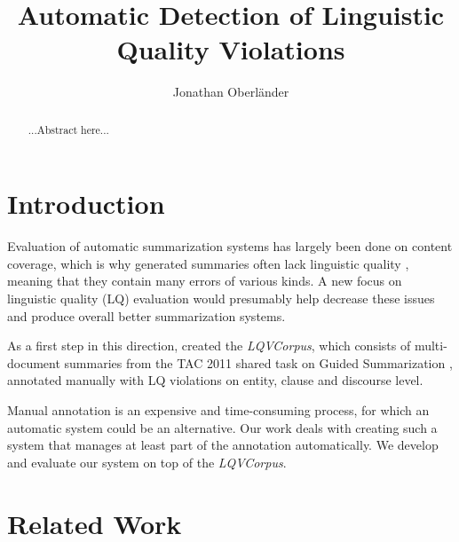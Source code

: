 \documentclass[a4paper,10pt]{scrartcl}
\author{Jonathan Oberländer}
\title{Automatic Detection of Linguistic Quality Violations}
\theoremstyle{style}
\begin{document}


\thispagestyle{empty}
\begin{abstract}
\setlength{\parskip}{2ex plus 0.5ex minus 0.2ex}
...Abstract here...

\end{abstract}
\newpage

\thispagestyle{empty}
\tableofcontents
\newpage

\setcounter{page}{1}		%
\newpage







\maketableofcontents

\section{Introduction}
Evaluation of automatic summarization systems has largely been done on content coverage, which is why generated summaries often lack linguistic quality \citep{nenkova2011foundations}, meaning that they contain many errors of various kinds. A new focus on linguistic quality (LQ) evaluation would presumably help decrease these issues and produce overall better summarization systems.

As a first step in this direction, \cite{friedrichlqvsumm} created the \textit{LQVCorpus}, which consists of multi-document summaries from the TAC 2011 shared task on Guided Summarization \citep{owczarzak2011overview}, annotated manually with LQ violations on entity, clause and discourse level.

Manual annotation is an expensive and time-consuming process, for which an automatic system could be an alternative. Our work deals with creating such a system that manages at least part of the annotation automatically. We develop and evaluate our system on top of the \textit{LQVCorpus}.

\section{Related Work}
\end{document}
